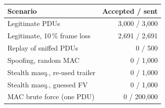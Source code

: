 \begin{tabular}{@{}lr@{}}
\toprule
Scenario & Accepted / sent\\
\midrule
Legitimate PDUs & 3{,}000 / 3{,}000\\
Legitimate, 10\,\% frame loss & 2{,}691 / 2{,}691\\
Replay of sniffed PDUs & 0 / 500\\
Spoofing, random MAC & 0 / 1{,}000\\
Stealth masq., re-used trailer & 0 / 1{,}000\\
Stealth masq., guessed FV & 0 / 1{,}000\\
MAC brute force (one PDU) & 0 / 200{,}000\\
\bottomrule
\end{tabular}
